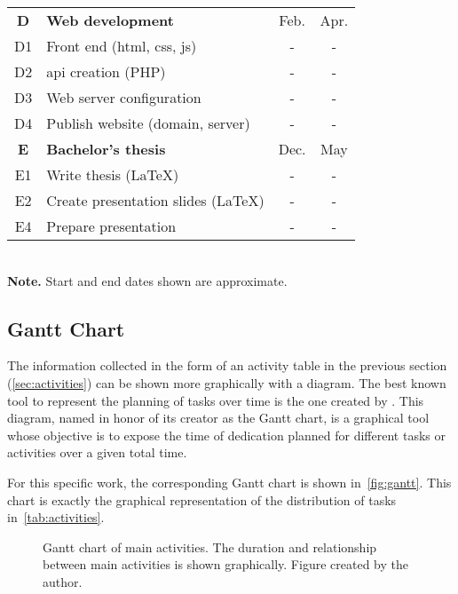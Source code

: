 \begin{table}[p]
\begin{tabular}{cp{}cc}
    \textbf{D} & \textbf{Web development}                    & Feb. & Apr. \\
    D1         & Front end (\acs{html}, \acs{css}, \acs{js}) & -    & -    \\
    D2         & \Acs{api} creation (PHP)                    & -    & -    \\
    D3         & Web server configuration                    & -    & -    \\
    D4         & Publish website (domain, server)            & -    & -    \\
    \midrule

    \rowcolor{rowColor}
    \textbf{E}             & \textbf{Bachelor's thesis}          & Dec. & May \\
    \rowcolor{rowColor}
    E1                     & Write thesis (\LaTeX)               & -    & -   \\
    \rowcolor{rowColor}
    E2                     & Create presentation slides (\LaTeX) & -    & -   \\
    \rowcolor{rowColor} E4 & Prepare presentation                & -    & -   \\
    \bottomrule
  \end{tabular}\\[1.25ex]
  {\small\textbf{Note.} Start and end dates shown are approximate.}
\end{table}


\subsection{Gantt Chart}\label{sec:gantt}

The information collected in the form of an activity table in the previous
section (\vref{sec:activities}) can be shown more graphically with a
diagram. The best known tool to represent the planning of tasks over time is
the one created by . This
diagram, named in honor of its creator as the Gantt chart, is a graphical tool
whose objective is to expose the time of dedication planned for different tasks
or activities over a given total time.

For this specific work, the corresponding Gantt chart is shown in\
\vref{fig:gantt}. This chart is exactly the graphical representation of the
distribution of tasks in\ \vref{tab:activities}.

\begin{figure}[ht]
  \centering
  
  \vspace{-.6cm} %
  \caption[Gantt chart of main activities]{Gantt chart of main activities. The
    duration and relationship between main activities is shown
    graphically. Figure created by the author.}%
  \label{fig:gantt}
\end{figure}



